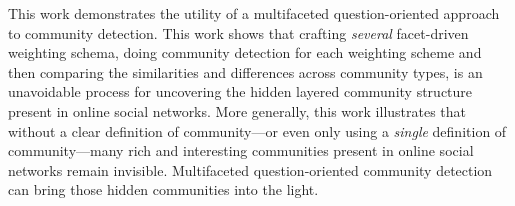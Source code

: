 



This work demonstrates the utility of a multifaceted question-oriented approach to community detection. This work shows that crafting \emph{several} facet-driven weighting schema, doing community detection for each weighting scheme and then comparing the similarities and differences across community types, is an unavoidable process for uncovering the hidden layered community structure present in online social networks. More generally, this work illustrates that without a clear definition of community---or even only using a \emph{single} definition of community---many rich and interesting communities present in online social networks remain invisible. Multifaceted question-oriented community detection can bring those hidden communities into the light.

